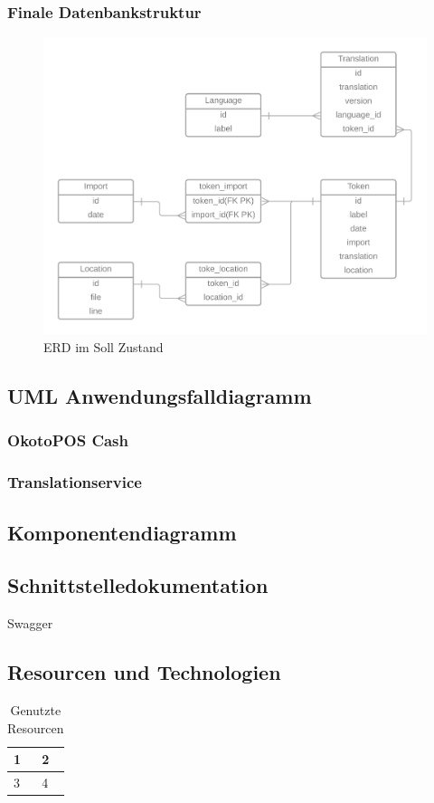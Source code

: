 \documentclass[10pt, oneside]{article}
\begin{document}
  \subsubsection{Finale Datenbankstruktur}\label{sec:erd:final}
  \begin{figure}[ht]
    \label{abb:erd:final}
    \centering
    \includegraphics[width=\textwidth]{ERD_TranslationService_IST-Analyse.png}
    \caption{ERD im Soll Zustand}
  \end{figure}
  \newpage
  \subsection{UML Anwendungsfalldiagramm}\label{sec:uml:aw:new}
  \subsubsection{OkotoPOS Cash}\label{sec:uml:aw:cash}
  \subsubsection{Translationservice}\label{sec:uml:aw:ts}
  \subsection{Komponentendiagramm}\label{sec:uml:komponenten}
  \subsection{Schnittstelledokumentation}
    \label{sec:swa:ts}
  Swagger
  \subsection{Resourcen und Technologien}\label{sec:resources}
    \begin{table}[ht]
      \centering
      \begin{tabular}{| l | l |}
        1 & 2 \\
        \hline
        3 & 4\\
        \hline
      \end{tabular}
      \caption{Genutzte Resourcen}
    \end{table}
\end{document}

